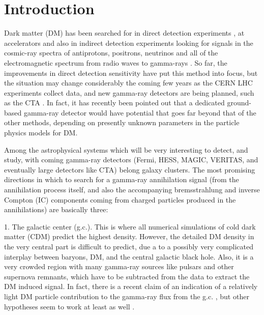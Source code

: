 \documentclass[10pt,aps,pra,reprint,amsmath,amsfonts,amssymb,showpacs,nofootinbib,floatfix]{revtex4-1}
\begin{document}
\maketitle
\section{Introduction}

Dark matter (DM) has been searched for in direct detection experiments
\cite{Pato:2010zk}, at accelerators
\cite{Ellis:2001hv,Baer:2006ff,Khachatryan:2011tk} and also in
indirect detection experiments looking for signals in the cosmic-ray
spectra of antiprotons, positrons, neutrinos and all of the
electromagnetic spectrum from radio waves to gamma-rays
\cite{Bergstrom:2009ib}. So far, the improvements in direct detection
sensitivity have put this method into focus, but the situation may
change considerably the coming few years as the CERN LHC experiments
collect data, and new gamma-ray detectors are being planned, such as
the CTA \cite{Consortium:2010bc}. In fact, it has recently been
pointed out \cite{Bergstrom:2010gh} that a dedicated ground-based
gamma-ray detector would have potential that goes far beyond that of
the other methods, depending on presently unknown parameters in the
particle physics models for DM.


Among the astrophysical systems which will be very interesting to
detect, and study, with coming gamma-ray detectors (Fermi, HESS,
MAGIC, VERITAS, and eventually large detectors like CTA) belong galaxy
clusters. The most promising directions in which to search for a
gamma-ray annihilation signal (from the annihilation process itself,
and also the accompanying bremsstrahlung and inverse Compton (IC)
components coming from charged particles produced in the annihilations)
are basically three:

1. The galactic center (g.c.). This is where all numerical simulations
of cold dark matter (CDM) predict the highest density. However, the
detailed DM density in the very central part is difficult to predict,
due a to a possibly very complicated interplay between baryons, DM,
and the central galactic black hole. Also, it is a very crowded region
with many gamma-ray sources like pulsars and other supernova remnants,
which have to be subtracted from the data to extract the DM induced
signal. In fact, there is a recent claim of an indication of a
relatively light DM particle contribution to the gamma-ray flux from
the g.c. \cite{2010arXiv1010.2752H}, 
but other hypotheses seem to work
at least as well \cite{2010arXiv1012.5839B}.
\end{document}
